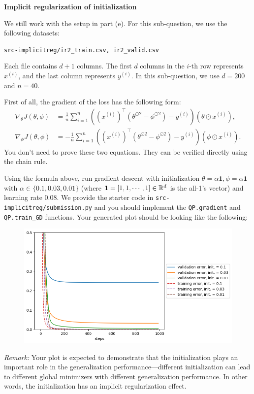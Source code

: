 \item {} \textbf{Implicit regularization of initialization}

We still work with the setup in part (e).
For this sub-question, we use the following datasets:
\begin{center}
	\texttt{src-implicitreg/ir2\_train.csv, ir2\_valid.csv}
\end{center}
Each file contains $d+1$ columns. The first $d$ columns in the $i$-th row represents $x^{(i)}$, and the last column represents $y^{(i)}.$ In this sub-question, we use $d=200$ and $n=40$.

First of all, the gradient of the loss has the following form:
\begin{align}
	\nabla_\theta J(\theta,\phi)&=\frac{1}{n}\sum_{i=1}^{n}((x^{(i)})^\top (\theta^{\odot 2} -\phi^{\odot 2})-y^{(i)})(\theta\odot x^{(i)}),\\
	\nabla_\phi J(\theta,\phi)&=-\frac{1}{n}\sum_{i=1}^{n}((x^{(i)})^\top (\theta^{\odot 2} -\phi^{\odot 2})-y^{(i)})(\phi\odot x^{(i)}).
\end{align}
You don't need to prove these two equations. They can be verified directly using the chain rule.

Using the formula above, run gradient descent with initialization $\theta=\alpha \mathbf{1}, \phi=\alpha\mathbf{1}$ with $\alpha\in \{0.1, 0.03, 0.01\}$ (where $\mathbf{1}=[1,1,\cdots,1]\in\mathbb{R}^{d}$ is the all-1's vector) and learning rate $0.08$. We provide the starter code in \texttt{src-implicitreg/submission.py} and you should implement the \texttt{QP.gradient} and \texttt{QP.train\_GD} functions. Your generated plot should be looking like the following:

\begin{figure}[H]
	\centering
	\includegraphics[width=.7\linewidth]{04-implicitreg/implicitreg_quadratic_initialization.png}
\end{figure}

\textit{Remark:} Your plot is expected to demonstrate that the initialization plays an important role in the generalization performance---different initialization can lead to different global minimizers with different generalization performance. In other words, the initialization has an implicit regularization effect. 